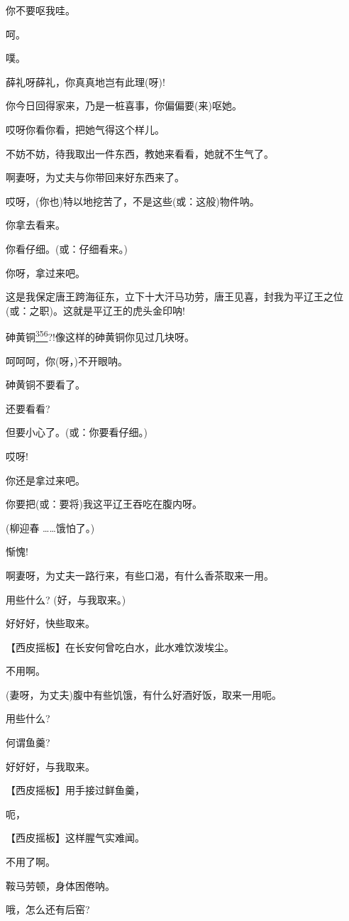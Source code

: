 你不要呕我哇。

呵。

噗。

薛礼呀薛礼，你真真地岂有此理(呀)!

你今日回得家来，乃是一桩喜事，你偏偏要(来)呕她。

哎呀你看你看，把她气得这个样儿。

不妨不妨，待我取出一件东西，教她来看看，她就不生气了。

啊妻呀，为丈夫与你带回来好东西来了。

哎呀，(你也)特以地挖苦了，不是这些(或：这般)物件呐。

你拿去看来。

你看仔细。(或：仔细看来。)

你呀，拿过来吧。

这是我保定唐王跨海征东，立下十大汗马功劳，唐王见喜，封我为平辽王之位(或：之职)。这就是平辽王的虎头金印呐!

砷黄铜\protect\hyperlink{fn356}{\textsuperscript{356}}?!像这样的砷黄铜你见过几块呀。

呵呵呵，你(呀，)不开眼呐。

砷黄铜不要看了。

还要看看?

但要小心了。(或：你要看仔细。)

哎呀!

你还是拿过来吧。

你要把(或：要将)我这平辽王吞吃在腹内呀。

(柳迎春 \ldots{}\ldots{}饿怕了。)

惭愧!

啊妻呀，为丈夫一路行来，有些口渴，有什么香茶取来一用。

用些什么? (好，与我取来。)

好好好，快些取来。

【西皮摇板】在长安何曾吃白水，此水难饮泼埃尘。

不用啊。

(妻呀，为丈夫)腹中有些饥饿，有什么好酒好饭，取来一用呃。

用些什么?

何谓鱼羹?

好好好，与我取来。

【西皮摇板】用手接过鲜鱼羹，

呃，

【西皮摇板】这样腥气实难闻。

不用了啊。

鞍马劳顿，身体困倦呐。

哦，怎么还有后窑?

